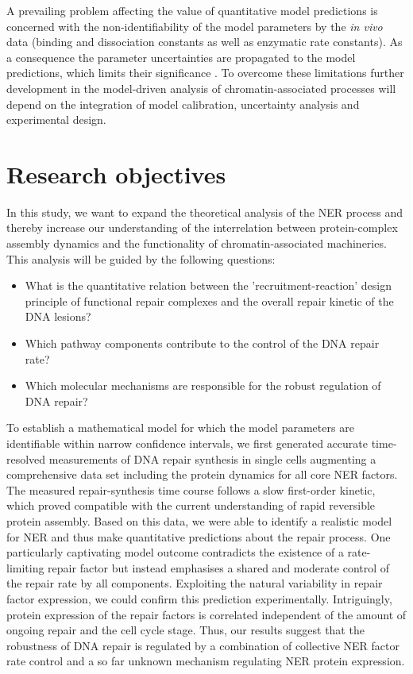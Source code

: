 A prevailing problem affecting the value of quantitative model predictions is concerned with the non-identifiability of the model parameters by the \textit{in vivo} data (binding and dissociation constants as well as enzymatic rate constants). As a consequence the parameter uncertainties are propagated to the model predictions, which limits their significance \cite{Raue2013}. To overcome these limitations further development in the model-driven analysis of chromatin-associated processes will depend on the integration of model calibration, uncertainty analysis and experimental design.     
  

\section{Research objectives}

In this study, we want to expand the theoretical analysis of the NER process and thereby increase our understanding of the interrelation between protein-complex assembly dynamics and the functionality of chromatin-associated machineries. This analysis will be guided by the following questions:

\begin{itemize}
	\item What is the quantitative relation between the 'recruitment-reaction' design principle of functional repair complexes and the overall repair kinetic of the DNA lesions?
	
	\item Which pathway components contribute to the control of the DNA repair rate? 
	
	\item Which molecular mechanisms are responsible for the robust regulation of DNA repair? 
\end{itemize} 


To establish a mathematical model for which the model parameters are identifiable within narrow confidence intervals, we first generated accurate time-resolved measurements of DNA repair synthesis in single cells augmenting a comprehensive data set including the protein dynamics for all core NER factors. The measured repair-synthesis time course follows a slow first-order kinetic, which proved compatible with the current understanding of rapid reversible protein assembly. Based on this data, we were able to identify a realistic model for NER and thus make quantitative predictions about the repair process. One particularly captivating model outcome contradicts the existence of a rate-limiting repair factor but instead emphasises a shared and moderate control of the repair rate by all components. Exploiting the natural variability in repair factor expression, we could confirm this prediction experimentally. Intriguingly, protein expression of the repair factors is correlated independent of the amount of ongoing repair and the cell cycle stage. Thus, our results suggest that the robustness of DNA repair is regulated by a combination of collective NER factor rate control and a so far unknown mechanism regulating NER protein expression.\\   

